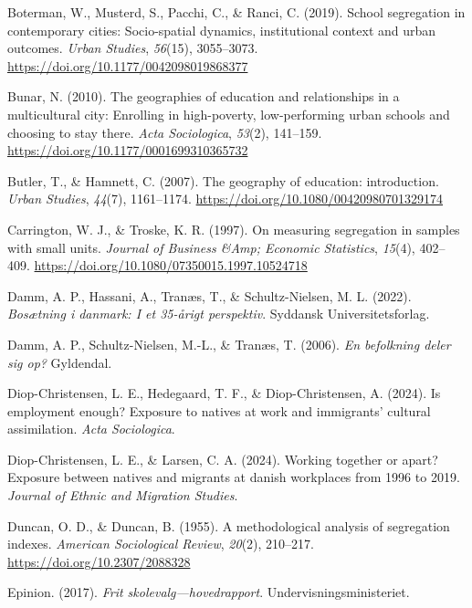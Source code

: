 \documentclass[
]{book}
\newlength{\cslhangindent}
\newenvironment{CSLReferences}[2] %
 {\begin{list}{}{%
  \setlength{\itemindent}{0pt}
  \setlength{\leftmargin}{0pt}
  \setlength{\parsep}{0pt}
  \ifodd #1
   \setlength{\leftmargin}{\cslhangindent}
   \setlength{\itemindent}{-1\cslhangindent}
  \fi
  \setlength{\itemsep}{#2\baselineskip}}}
 {\end{list}}
\begin{document}
\begin{CSLReferences}{1}{0}
Boterman, W., Musterd, S., Pacchi, C., \& Ranci, C. (2019). School segregation in contemporary cities: Socio-spatial dynamics, institutional context and urban outcomes. \emph{Urban Studies}, \emph{56}(15), 3055--3073. \url{https://doi.org/10.1177/0042098019868377}

Bunar, N. (2010). The geographies of education and relationships in a multicultural city: Enrolling in high-poverty, low-performing urban schools and choosing to stay there. \emph{Acta Sociologica}, \emph{53}(2), 141--159. \url{https://doi.org/10.1177/0001699310365732}

Butler, T., \& Hamnett, C. (2007). The geography of education: introduction. \emph{Urban Studies}, \emph{44}(7), 1161--1174. \url{https://doi.org/10.1080/00420980701329174}

Carrington, W. J., \& Troske, K. R. (1997). On measuring segregation in samples with small units. \emph{Journal of Business \&Amp; Economic Statistics}, \emph{15}(4), 402--409. \url{https://doi.org/10.1080/07350015.1997.10524718}

Damm, A. P., Hassani, A., Tranæs, T., \& Schultz-Nielsen, M. L. (2022). \emph{Bosætning i danmark: I et 35-årigt perspektiv}. Syddansk Universitetsforlag.

Damm, A. P., Schultz-Nielsen, M.-L., \& Tranæs, T. (2006). \emph{En befolkning deler sig op?} Gyldendal.

Diop-Christensen, L. E., Hedegaard, T. F., \& Diop-Christensen, A. (2024). Is employment enough? Exposure to natives at work and immigrants' cultural assimilation. \emph{Acta Sociologica}.

Diop-Christensen, L. E., \& Larsen, C. A. (2024). Working together or apart? Exposure between natives and migrants at danish workplaces from 1996 to 2019. \emph{Journal of Ethnic and Migration Studies}.

Duncan, O. D., \& Duncan, B. (1955). A methodological analysis of segregation indexes. \emph{American Sociological Review}, \emph{20}(2), 210--217. \url{https://doi.org/10.2307/2088328}

Epinion. (2017). \emph{Frit skolevalg---hovedrapport}. Undervisningsministeriet.


\end{CSLReferences}
\end{document}
